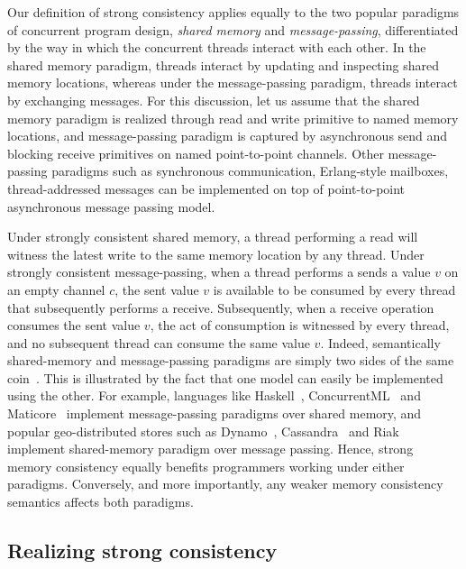 Our definition of strong consistency applies equally to the two popular
paradigms of concurrent program design, \emph{shared memory} and
\emph{message-passing}, differentiated by the way in which the concurrent
threads interact with each other. In the shared memory paradigm, threads
interact by updating and inspecting shared memory locations, whereas under the
message-passing paradigm, threads interact by exchanging messages. For this
discussion, let us assume that the shared memory paradigm is realized through
read and write primitive to named memory locations, and message-passing
paradigm is captured by asynchronous send and blocking receive primitives on
named point-to-point channels. Other message-passing paradigms such as
synchronous communication, Erlang-style mailboxes, thread-addressed messages
can be implemented on top of point-to-point asynchronous message passing model.

Under strongly consistent shared memory, a thread performing a read will
witness the latest write to the same memory location by any thread. Under
strongly consistent message-passing, when a thread performs a sends a value $v$
on an empty channel $c$, the sent value $v$ is available to be consumed by
every thread that subsequently performs a receive. Subsequently, when a receive
operation consumes the sent value $v$, the act of consumption is witnessed by
every thread, and no subsequent thread can consume the same value $v$. Indeed,
semantically shared-memory and message-passing paradigms are simply two sides
of the same coin~\cite{Turon2013,Lauer1979}. This is illustrated by the fact
that one model can easily be implemented using the other. For example,
languages like Haskell~\cite{haskellsm}, ConcurrentML~\cite{Reppy99} and
Maticore~\cite{Fluet2007} implement message-passing paradigms over shared
memory, and popular geo-distributed stores such as Dynamo~\cite{DeCandia2007},
Cassandra~\cite{Lakshman2010} and Riak~\cite{Riak} implement shared-memory
paradigm over message passing. Hence, strong memory consistency equally
benefits programmers working under either paradigms. Conversely, and more
importantly, any weaker memory consistency semantics affects both paradigms.

\subsection{Realizing strong consistency}


